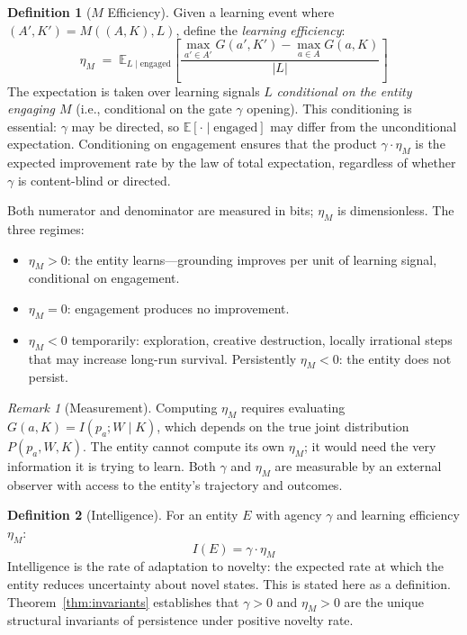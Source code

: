 \documentclass[11pt]{article}
\theoremstyle{definition}
\newtheorem{definition}{Definition}
\theoremstyle{remark}
\newtheorem{remark}{Remark}
\begin{document}
\begin{definition}[$M$ Efficiency]
\label{def:eta}
Given a learning event where $(A', K') = M((A, K), L)$, define the
\emph{learning efficiency}:
\[
\eta_M \;=\; \mathbb{E}_{L \mid \text{engaged}}\!\left[
\frac{\max_{a' \in A'} G(a', K') - \max_{a \in A} G(a, K)}{|L|}
\right]
\]
The expectation is taken over learning signals $L$ \emph{conditional on
the entity engaging $M$} (i.e., conditional on the gate $\gamma$
opening). This conditioning is essential: $\gamma$ may be directed,
so $\mathbb{E}[{\cdot} \mid \text{engaged}]$ may differ from the
unconditional expectation. Conditioning on engagement ensures that the
product $\gamma \cdot \eta_M$ is the expected improvement rate by the
law of total expectation, regardless of whether $\gamma$ is
content-blind or directed.

Both numerator and denominator are measured in bits; $\eta_M$ is
dimensionless. The three regimes:
\begin{itemize}
\item $\eta_M > 0$: the entity learns---grounding improves per unit
      of learning signal, conditional on engagement.
\item $\eta_M = 0$: engagement produces no improvement.
\item $\eta_M < 0$ temporarily: exploration, creative destruction,
      locally irrational steps that may increase long-run survival.
      Persistently $\eta_M < 0$: the entity does not persist.
\end{itemize}
\end{definition}

\begin{remark}[Measurement]
\label{rem:measurement}
Computing $\eta_M$ requires evaluating $G(a, K) = I(p_a; W \mid K)$,
which depends on the true joint distribution $P(p_a, W, K)$. The entity
cannot compute its own $\eta_M$; it would need the very information
it is trying to learn. Both $\gamma$ and $\eta_M$ are measurable by an
external observer with access to the entity's trajectory and outcomes.
\end{remark}

\begin{definition}[Intelligence]
\label{def:intelligence}
For an entity $E$ with agency $\gamma$ and learning efficiency $\eta_M$:
\[
I(E) = \gamma \cdot \eta_M
\]
Intelligence is the rate of adaptation to novelty: the expected rate at
which the entity reduces uncertainty about novel states. This is stated
here as a definition. Theorem~\ref{thm:invariants} establishes that
$\gamma > 0$ and $\eta_M > 0$ are the unique structural invariants
of persistence under positive novelty rate.
\end{definition}
\end{document}
